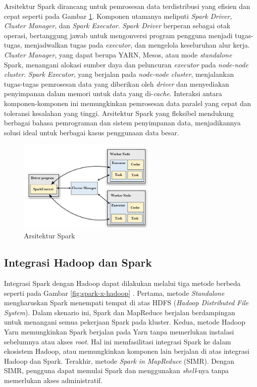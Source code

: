 Arsitektur Spark dirancang untuk pemrosesan data terdistribusi yang efisien dan cepat seperti pada Gambar \ref{fig:spark-arch}. Komponen utamanya meliputi \textit{Spark Driver, Cluster Manager}, dan \textit{Spark Executor}. \textit{Spark Driver} berperan sebagai otak operasi, bertanggung jawab untuk mengonversi program pengguna menjadi tugas-tugas, menjadwalkan tugas pada \textit{executor}, dan mengelola keseluruhan alur kerja. \textit{Cluster Manager}, yang dapat berupa YARN, Mesos, atau mode \textit{standalone} Spark, menangani alokasi sumber daya dan peluncuran \textit{executor} pada \textit{node-node cluster}. \textit{Spark Executor}, yang berjalan pada \textit{node-node cluster}, menjalankan tugas-tugas pemrosesan data yang diberikan oleh \textit{driver} dan menyediakan penyimpanan dalam memori untuk data yang di-\textit{cache}. Interaksi antara komponen-komponen ini memungkinkan pemrosesan data paralel yang cepat dan toleransi kesalahan yang tinggi. Arsitektur Spark yang fleksibel mendukung berbagai bahasa pemrograman dan sistem penyimpanan data, menjadikannya solusi ideal untuk berbagai kasus penggunaan data besar.

\begin{figure}[h]
    \centering
    \includegraphics[width=0.6\textwidth]{figures/ch02/spark-arch.jpeg}
    \caption{Arsitektur Spark}
    \label{fig:spark-arch}
\end{figure}

\subsection{Integrasi Hadoop dan Spark}
Integrasi Spark dengan Hadoop dapat dilakukan melalui tiga metode berbeda seperti pada Gambar \ref{fig:spark-x-hadoop}  \cite{ApacheSparkIntroduction}. Pertama, metode \textit{Standalone} mengharuskan Spark menempati tempat di atas HDFS (\textit{Hadoop Distributed File System}). Dalam skenario ini, Spark dan MapReduce berjalan berdampingan untuk menangani semua pekerjaan Spark pada kluster. Kedua, metode Hadoop Yarn memungkinkan Spark berjalan pada Yarn tanpa memerlukan instalasi sebelumnya atau akses \textit{root}. Hal ini memfasilitasi integrasi Spark ke dalam ekosistem Hadoop, atau memungkinkan komponen lain berjalan di atas integrasi Hadoop dan Spark. Terakhir, metode \textit{Spark in MapReduce} (SIMR). Dengan SIMR, pengguna dapat memulai Spark dan menggunakan \textit{shell}-nya tanpa memerlukan akses administratif. 

